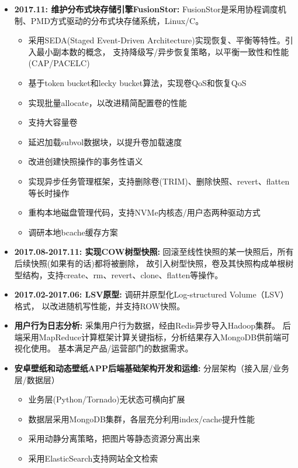   \begin{itemize}[leftmargin=*]
      \item \textbf{2017.11: 维护分布式块存储引擎FusionStor:} FusionStor是采用协程调度机制、PMD方式驱动的分布式块存储系统，Linux/C。
          {\small
          \begin{itemize}
              \item 采用SEDA(Staged Event-Driven Architecture)实现恢复、平衡等特性。引入最小副本数的概念，
                  支持降级写/异步恢复策略，以平衡一致性和性能(CAP/PACELC)
              \item 基于token bucket和lecky bucket算法，实现卷QoS和恢复QoS
              \item 实现批量allocate，以改进精简配置卷的性能
              \item 支持大容量卷
              \item 延迟加载subvol数据块，以提升卷加载速度
              \item 改进创建快照操作的事务性语义
              \item 实现异步任务管理框架，支持删除卷(TRIM)、删除快照、revert、flatten等长时操作
              \item 重构本地磁盘管理代码，支持NVMe内核态/用户态两种驱动方式
              \item 调研本地bcache缓存方案
          \end{itemize}
          }

      \item \textbf{2017.08-2017.11: 实现COW树型快照:} 回滚至线性快照的某一快照后，所有后续快照(如果有的话)都将被删除，
          故引入树型快照，卷及其快照构成单根树型结构，支持create、rm、revert、clone、flatten等操作。

      \item \textbf{2017.02-2017.06: LSV原型:} 调研并原型化Log-structured Volume（LSV）格式，
          以改进随机写性能，并支持ROW快照。

      \item \textbf{用户行为日志分析:} 采集用户行为数据，经由Redis异步导入Hadoop集群。
          后端采用MapReduce计算框架计算关键指标，分析结果存入MongoDB供前端可视化使用。
          基本满足产品/运营部门的数据需求。

      \item \textbf{安卓壁纸和动态壁纸APP后端基础架构开发和运维:} 分层架构（接入层/业务层/数据层）
          {\small
          \begin{itemize}
              \item 业务层(Python/Tornado)无状态可横向扩展
              \item 数据层采用MongoDB集群，各层充分利用index/cache提升性能
              \item 采用动静分离策略，把图片等静态资源分离出来
              \item 采用ElasticSearch支持网站全文检索
          \end{itemize}
          }


\end{itemize}
